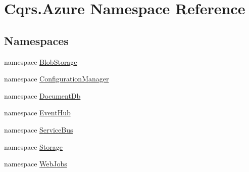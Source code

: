 \hypertarget{namespaceCqrs_1_1Azure}{}\section{Cqrs.\+Azure Namespace Reference}
\label{namespaceCqrs_1_1Azure}
\subsection*{Namespaces}
\begin{DoxyCompactItemize}
\item 
namespace \hyperlink{namespaceCqrs_1_1Azure_1_1BlobStorage}{Blob\+Storage}
\item 
namespace \hyperlink{namespaceCqrs_1_1Azure_1_1ConfigurationManager}{Configuration\+Manager}
\item 
namespace \hyperlink{namespaceCqrs_1_1Azure_1_1DocumentDb}{Document\+Db}
\item 
namespace \hyperlink{namespaceCqrs_1_1Azure_1_1EventHub}{Event\+Hub}
\item 
namespace \hyperlink{namespaceCqrs_1_1Azure_1_1ServiceBus}{Service\+Bus}
\item 
namespace \hyperlink{namespaceCqrs_1_1Azure_1_1Storage}{Storage}
\item 
namespace \hyperlink{namespaceCqrs_1_1Azure_1_1WebJobs}{Web\+Jobs}
\end{DoxyCompactItemize}

